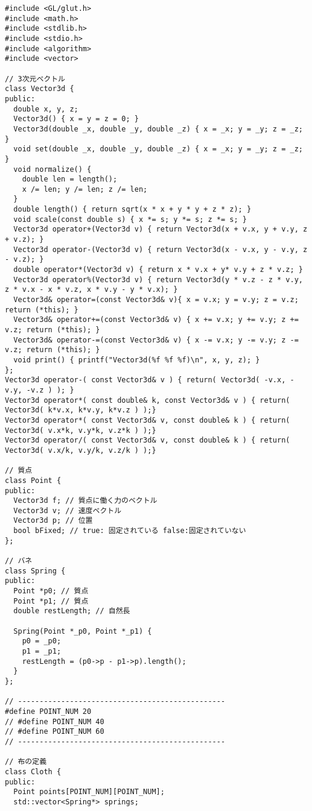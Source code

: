\documentclass{scrartcl}
\begin{document}
\begin{verbatim}
#include <GL/glut.h>
#include <math.h>   
#include <stdlib.h> 
#include <stdio.h> 
#include <algorithm>
#include <vector>

// 3次元ベクトル
class Vector3d {
public:
  double x, y, z;
  Vector3d() { x = y = z = 0; }
  Vector3d(double _x, double _y, double _z) { x = _x; y = _y; z = _z; }
  void set(double _x, double _y, double _z) { x = _x; y = _y; z = _z; }
  void normalize() {
    double len = length();
    x /= len; y /= len; z /= len;
  }
  double length() { return sqrt(x * x + y * y + z * z); }
  void scale(const double s) { x *= s; y *= s; z *= s; }
  Vector3d operator+(Vector3d v) { return Vector3d(x + v.x, y + v.y, z + v.z); }
  Vector3d operator-(Vector3d v) { return Vector3d(x - v.x, y - v.y, z - v.z); }
  double operator*(Vector3d v) { return x * v.x + y* v.y + z * v.z; }
  Vector3d operator%(Vector3d v) { return Vector3d(y * v.z - z * v.y, z * v.x - x * v.z, x * v.y - y * v.x); }
  Vector3d& operator=(const Vector3d& v){ x = v.x; y = v.y; z = v.z; return (*this); }
  Vector3d& operator+=(const Vector3d& v) { x += v.x; y += v.y; z += v.z; return (*this); }
  Vector3d& operator-=(const Vector3d& v) { x -= v.x; y -= v.y; z -= v.z; return (*this); }
  void print() { printf("Vector3d(%f %f %f)\n", x, y, z); }
};
Vector3d operator-( const Vector3d& v ) { return( Vector3d( -v.x, -v.y, -v.z ) ); }
Vector3d operator*( const double& k, const Vector3d& v ) { return( Vector3d( k*v.x, k*v.y, k*v.z ) );}
Vector3d operator*( const Vector3d& v, const double& k ) { return( Vector3d( v.x*k, v.y*k, v.z*k ) );}
Vector3d operator/( const Vector3d& v, const double& k ) { return( Vector3d( v.x/k, v.y/k, v.z/k ) );}

// 質点
class Point {
public:
  Vector3d f; // 質点に働く力のベクトル
  Vector3d v; // 速度ベクトル
  Vector3d p; // 位置
  bool bFixed; // true: 固定されている false:固定されていない
};

// バネ
class Spring {
public:
  Point *p0; // 質点
  Point *p1; // 質点
  double restLength; // 自然長

  Spring(Point *_p0, Point *_p1) {
    p0 = _p0;
    p1 = _p1;
    restLength = (p0->p - p1->p).length();
  }
};

// ------------------------------------------------
#define POINT_NUM 20
// #define POINT_NUM 40
// #define POINT_NUM 60
// ------------------------------------------------

// 布の定義
class Cloth {
public:
  Point points[POINT_NUM][POINT_NUM];
  std::vector<Spring*> springs;


\end{verbatim}
\end{document}

